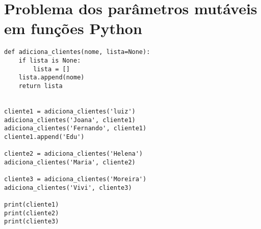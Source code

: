 \documentclass{article}
\begin{document}
\section{Problema dos parâmetros mutáveis em funções Python}
\begin{lstlisting}
def adiciona_clientes(nome, lista=None):
    if lista is None:
        lista = []
    lista.append(nome)
    return lista


cliente1 = adiciona_clientes('luiz')
adiciona_clientes('Joana', cliente1)
adiciona_clientes('Fernando', cliente1)
cliente1.append('Edu')

cliente2 = adiciona_clientes('Helena')
adiciona_clientes('Maria', cliente2)

cliente3 = adiciona_clientes('Moreira')
adiciona_clientes('Vivi', cliente3)

print(cliente1)
print(cliente2)
print(cliente3)
\end{lstlisting}
\end{document}
